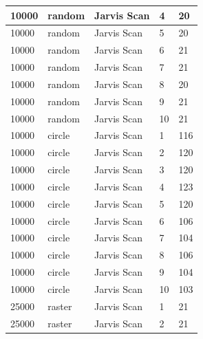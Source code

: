 \documentclass[12pt]{article}
\begin{document}
\begin{longtable}{|l|l|l|l|l|}
10000        & random            & Jarvis Scan & 4          & 20                            \\ \hline
10000        & random            & Jarvis Scan & 5          & 20                            \\ \hline
10000        & random            & Jarvis Scan & 6          & 21                            \\ \hline
10000        & random            & Jarvis Scan & 7          & 21                            \\ \hline
10000        & random            & Jarvis Scan & 8          & 20                            \\ \hline
10000        & random            & Jarvis Scan & 9          & 21                            \\ \hline
10000        & random            & Jarvis Scan & 10         & 21                            \\ \hline
10000        & circle            & Jarvis Scan & 1          & 116                           \\ \hline
10000        & circle            & Jarvis Scan & 2          & 120                           \\ \hline
10000        & circle            & Jarvis Scan & 3          & 120                           \\ \hline
10000        & circle            & Jarvis Scan & 4          & 123                           \\ \hline
10000        & circle            & Jarvis Scan & 5          & 120                           \\ \hline
10000        & circle            & Jarvis Scan & 6          & 106                           \\ \hline
10000        & circle            & Jarvis Scan & 7          & 104                           \\ \hline
10000        & circle            & Jarvis Scan & 8          & 106                           \\ \hline
10000        & circle            & Jarvis Scan & 9          & 104                           \\ \hline
10000        & circle            & Jarvis Scan & 10         & 103                           \\ \hline
25000        & raster            & Jarvis Scan & 1          & 21                            \\ \hline
25000        & raster            & Jarvis Scan & 2          & 21                            \\ \hline

\end{longtable}
\end{document}
